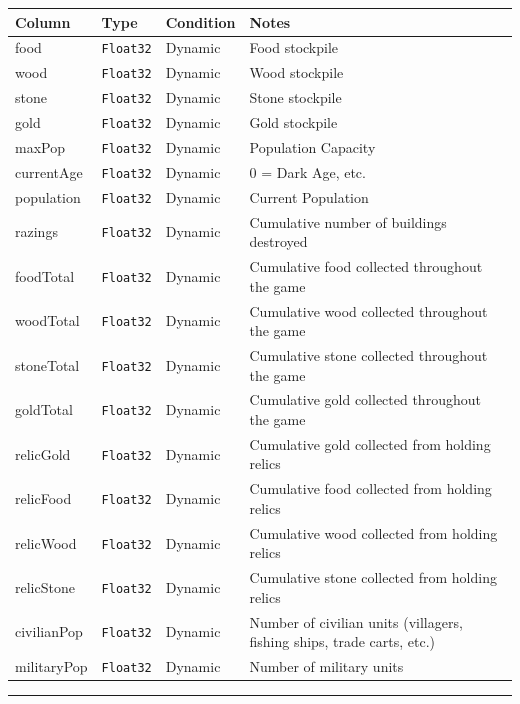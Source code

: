 \begin{longtable}{@{}p{}p{}p{}p{}@{}}
  \toprule
  Column & Type & Condition & Notes \\
  \midrule
  \endhead
  food & \texttt{Float32} & Dynamic & Food stockpile \\
  wood & \texttt{Float32} & Dynamic & Wood stockpile \\
  stone & \texttt{Float32} & Dynamic & Stone stockpile \\
  gold & \texttt{Float32} & Dynamic & Gold stockpile \\
  maxPop & \texttt{Float32} & Dynamic & Population Capacity \\
  currentAge & \texttt{Float32} & Dynamic & 0 = Dark Age, etc. \\
  population & \texttt{Float32} & Dynamic & Current Population \\
  razings & \texttt{Float32} & Dynamic & Cumulative number of buildings destroyed \\
  foodTotal & \texttt{Float32} & Dynamic & Cumulative food collected throughout the game \\
  woodTotal & \texttt{Float32} & Dynamic & Cumulative wood collected throughout the game \\
  stoneTotal & \texttt{Float32} & Dynamic & Cumulative stone collected throughout the game \\
  goldTotal & \texttt{Float32} & Dynamic & Cumulative gold collected throughout the game \\
  relicGold & \texttt{Float32} & Dynamic & Cumulative gold collected from holding relics \\
  relicFood & \texttt{Float32} & Dynamic & Cumulative food collected from holding relics \\
  relicWood & \texttt{Float32} & Dynamic & Cumulative wood collected from holding relics \\
  relicStone & \texttt{Float32} & Dynamic & Cumulative stone collected from holding relics \\
  civilianPop & \texttt{Float32} & Dynamic & Number of civilian units (villagers, fishing ships, trade carts, etc.) \\
  militaryPop & \texttt{Float32} & Dynamic & Number of military units \\
  \bottomrule
\end{longtable}

\par\noindent\rule{\textwidth}{0.4pt}

